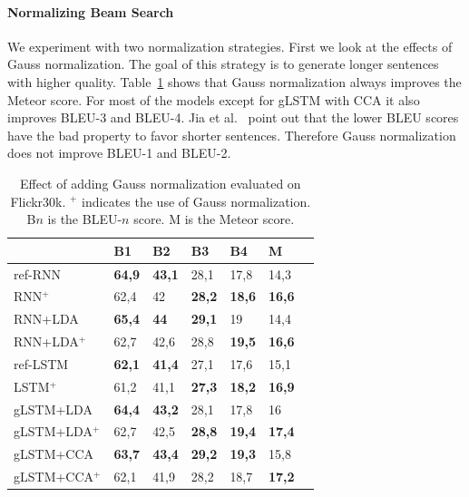 \documentclass[twoside,twocolumn]{article}
\begin{document}
	
	\paragraph{Normalizing Beam Search}
	We experiment with two normalization strategies. First we look at the effects of Gauss normalization. The goal of this strategy is to generate longer sentences with higher quality. Table~\ref{table:results_gauss} shows that Gauss normalization always improves the Meteor score. For most of the models except for gLSTM with CCA it also improves BLEU-3 and BLEU-4. Jia et al.~\cite{Jia2014} point out that the lower BLEU scores have the bad property to favor shorter sentences. Therefore Gauss normalization does not improve BLEU-1 and BLEU-2.
	
	\begin{table}
		\centering
		\begin{tabular}{lllllll}
			& B1 & B2 & B3 & B4 & M \\ \hline
			ref-RNN          & \textbf{64,9}  & \textbf{43,1}     & 28,1   & 17,8   & 14,3          \\
			RNN$^+$       & 62,4   & 42     & \textbf{28,2}   & \textbf{18,6}   & \textbf{16,6}          \\ \hline
			RNN+LDA         & \textbf{65,4}   & \textbf{44}     & \textbf{29,1}   &19     & 14,4 \\
			RNN+LDA$^+$ & 62,7   & 42,6   & 28,8   & \textbf{19,5}   & \textbf{16,6}           \\ \hline 
			ref-LSTM         & \textbf{62,1}   & \textbf{41,4}   & 27,1   & 17,6   & 15,1  \\
			LSTM$^+$        & 61,2   & 41,1   & \textbf{27,3}   & \textbf{18,2}   & \textbf{16,9}  \\ \hline
			gLSTM+LDA         & \textbf{64,4}   & \textbf{43,2}   & 28,1   & 17,8   & 16  \\
			gLSTM+LDA$^+$ & 62,7   & 42,5   & \textbf{28,8}   & \textbf{19,4}   & \textbf{17,4}  \\\hline
			gLSTM+CCA         & \textbf{63,7}   & \textbf{43,4}   & \textbf{29,2}   &\textbf{19,3}   & 15,8  \\
			gLSTM+CCA$^+$ & 62,1   & 41,9   & 28,2   & 18,7   & \textbf{17,2}  \\\hline
		\end{tabular}
		\caption{Effect of adding Gauss normalization evaluated on Flickr30k. $^+$ indicates the use of Gauss normalization. B$n$ is the BLEU-$n$ score. M is the Meteor score.}
		\label{table:results_gauss}
	\end{table}
	
\end{document}
